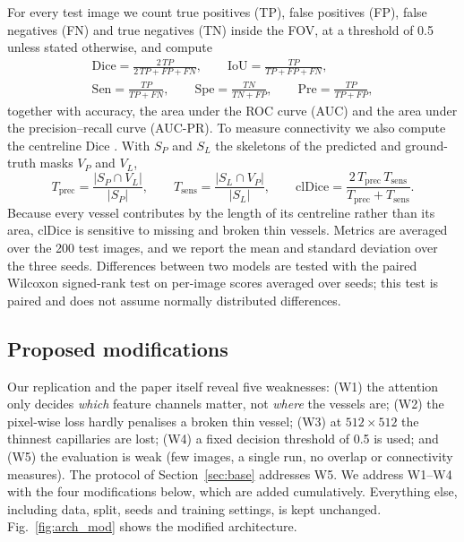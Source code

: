 \documentclass[a4paper,fleqn]{cas-sc}
\begin{document}
For every test image we count true positives (TP), false positives (FP), false negatives (FN) and true negatives (TN) inside the FOV, at a threshold of 0.5 unless stated otherwise, and compute
\begin{equation}
\begin{gathered}
\mathrm{Dice} = \frac{2\,TP}{2\,TP + FP + FN}, \qquad
\mathrm{IoU} = \frac{TP}{TP + FP + FN}, \\[4pt]
\mathrm{Sen} = \frac{TP}{TP + FN}, \qquad
\mathrm{Spe} = \frac{TN}{TN + FP}, \qquad
\mathrm{Pre} = \frac{TP}{TP + FP},
\end{gathered}
\end{equation}
together with accuracy, the area under the ROC curve (AUC) and the area under the precision--recall curve (AUC-PR). To measure connectivity we also compute the centreline Dice \citep{shit2021cldice}. With $S_P$ and $S_L$ the skeletons of the predicted and ground-truth masks $V_P$ and $V_L$,
\begin{equation}
T_{\mathrm{prec}} = \frac{|S_P \cap V_L|}{|S_P|}, \qquad
T_{\mathrm{sens}} = \frac{|S_L \cap V_P|}{|S_L|}, \qquad
\mathrm{clDice} = \frac{2\,T_{\mathrm{prec}}\,T_{\mathrm{sens}}}{T_{\mathrm{prec}} + T_{\mathrm{sens}}}.
\label{eq:cldice}
\end{equation}
Because every vessel contributes by the length of its centreline rather than its area, clDice is sensitive to missing and broken thin vessels. Metrics are averaged over the 200 test images, and we report the mean and standard deviation over the three seeds. Differences between two models are tested with the paired Wilcoxon signed-rank test \citep{wilcoxon1945} on per-image scores averaged over seeds; this test is paired and does not assume normally distributed differences.

\subsection{Proposed modifications}
\label{sec:mods}

Our replication and the paper itself reveal five weaknesses: (W1) the attention only decides \emph{which} feature channels matter, not \emph{where} the vessels are; (W2) the pixel-wise loss hardly penalises a broken thin vessel; (W3) at $512\times512$ the thinnest capillaries are lost; (W4) a fixed decision threshold of 0.5 is used; and (W5) the evaluation is weak (few images, a single run, no overlap or connectivity measures). The protocol of Section~\ref{sec:base} addresses W5. We address W1--W4 with the four modifications below, which are added cumulatively. Everything else, including data, split, seeds and training settings, is kept unchanged. Fig.~\ref{fig:arch_mod} shows the modified architecture.
\end{document}

